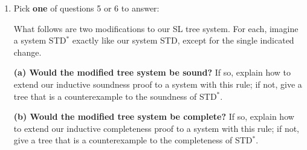 \documentclass[12pt]{article}
\def\eor{\ensuremath{\vee}}
\def\eand{\ensuremath{\,\&\,}}
\def\eif{\ensuremath{\supset}}
\def\eiff{\ensuremath{\equiv}}
\def\enot{\ensuremath{{\sim}}} %
\let\oldsim\sim %
\renewcommand{\sim}{{\oldsim}} %
\def\metaA{\ensuremath{\varPhi}}
\def\metaB{\ensuremath{\varPsi}}
\newcommand*{\metav}[1]{\ensuremath{\mathcal{#1}}}
\begin{document}
\begin{enumerate}
(iii) \textbf{Induction Hypothesis}: Assume that the property holds for all sentences of string length $n$ where $1 \leq n < k$, i.e. that all such sentences of SL are inspired. 

(iv) Consider an arbitrary sentence $\Delta$ of string length $k >1 $. Show that this sentence is inspired. By the recursive structure of SL, we know that there must exist component sentences \metaA{} and \metaB{}  (of length $< k$) such that $\Delta$ equals either (a) $\enot \metaA{}$, (b) $\metaA{} \eand \metaB{}$, (c) $\metaA{} \eor \metaB{}$, (d) $\metaA{} \eif \metaB{}$, or (e) $\metaA{} \eiff \metaB{}$. By the induction hypothesis, \metaA{} and \metaB{} are both inspired. 

In each of these five cases, there are three sub-cases to consider: (a) neither $\Delta$ nor $\enot \Delta$ appears on $O$, (b) $\Delta$ appears on $O$, or (c) $\enot \Delta$ appears on $O$. The five (a)-subcases are degenerate ($\Delta$ is trivially inspired). One (b)-subcase involves \enot \metaA{} appearing on $O$, in which case since \metaA{} is assumed to be inspired, \metaA{} must be false according to \metav{I} so that \enot \metaA{} is \metav{I}-true (and hence inspired). 

In the remaining nine cases, $\Delta$ occurs on $O$ and is resolved according to one of our nine tree rules. We then show that no matter which child node appears on $O$, $\Delta$ must be \metav{I}-true given that \metaA{} and \metaB{} are inspired.\dots \textit{Inspired BOOM}! 





\newpage


\item[] \begin{center} Pick \textbf{one} of questions 5 or 6 to answer: \end{center}

What follows are two modiﬁcations to our SL tree system. For each, imagine
a system STD$^{\ast}$ exactly like our system STD, except for the single indicated change.

\textbf{(a) Would the modiﬁed tree system be sound?} If so, explain how to extend our inductive soundness proof to a system with this rule; if not, give a tree that is a counterexample to the soundness of STD$^{\ast}$.

\textbf{(b) Would the modiﬁed tree system be complete?} If so, explain how to extend our inductive completeness proof to a system with this rule; if not, give a tree that is a counterexample to the completeness of  STD$^{\ast}$. 


\end{enumerate}
\end{document}
